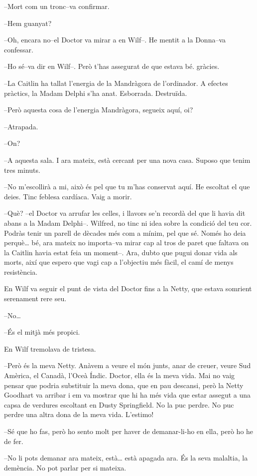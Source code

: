 --Mort com un tronc--va confirmar.

--Hem guanyat?

--Oh, encara no--el Doctor va mirar a en Wilf--. He mentit a la
Donna--va confessar.

--Ho sé--va dir en Wilf--. Però t'has assegurat de que estava bé.
gràcies.

--La Caitlin ha tallat l'energia de la Mandràgora de l'ordinador. A
efectes pràctics, la Madam Delphi s'ha anat. Esborrada. Destruïda.

--Però aquesta cosa de l'energia Mandràgora, segueix aquí, oi?

--Atrapada.

--On?

--A aquesta sala. I ara mateix, està cercant per una nova casa. Suposo
que tenim tres minuts.

--No m'escollirà a mi, això és pel que tu m'has conservat aquí. He
escoltat el que deies. Tinc feblesa cardíaca. Vaig a morir.

--Què? --el Doctor va arrufar les celles, i llavors se'n recordà del que
li havia dit abans a la Madam Delphi--. Wilfred, no tinc ni idea sobre
la condició del teu cor. Podràs tenir un parell de dècades més com a
mínim, pel que sé. Només ho deia perquè\ldots{} bé, ara mateix no
importa--va mirar cap al tros de paret que faltava on la Caitlin havia
estat feia un moment--. Ara, dubto que pugui donar vida als morts, així
que espero que vagi cap a l'objectiu més fàcil, el camí de menys
resistència.

En Wilf va seguir el punt de vista del Doctor fins a la Netty, que
estava somrient serenament rere seu.

--No\ldots{}

--És el mitjà més propici.

En Wilf tremolava de tristesa.

--Però és la meva Netty. Anàvem a veure el món junts, anar de creuer,
veure Sud Amèrica, el Canadà, l'Oceà Índic. Doctor, ella és la meva
vida. Mai no vaig pensar que podria substituir la meva dona, que en pau
descansi, però la Netty Goodhart va arribar i em va mostrar que hi ha
més vida que estar assegut a una capsa de verdures escoltant en Dusty
Springfield. No la puc perdre. No puc perdre una altra dona de la meva
vida. L'estimo!

--Sé que ho fas, però ho sento molt per haver de demanar-li-ho en ella,
però ho he de fer.

--No li pots demanar ara mateix, està\ldots{} està apagada ara. És la
seva malaltia, la demència. No pot parlar per si mateixa. ~

